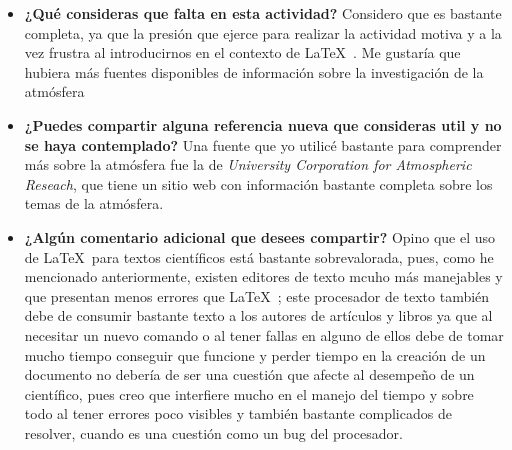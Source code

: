 \documentclass[12pt]{article}
\begin{document}
\begin{itemize}
\item\textbf{ ¿Qué consideras que falta en esta actividad? }
Considero que es bastante completa, ya que la presión que ejerce para realizar la actividad motiva y a la vez frustra al introducirnos en el contexto de \LaTeX\ . Me gustaría que hubiera más fuentes disponibles de información sobre la investigación de la atmósfera

\item \textbf{¿Puedes compartir alguna referencia nueva que consideras util y no se haya contemplado?}
Una fuente que yo utilicé bastante para comprender más sobre la atmósfera fue la de \textit{University Corporation for Atmospheric Reseach}, que tiene un sitio web con información bastante completa sobre los temas de la atmósfera.

\item \textbf{¿Algún comentario adicional que desees compartir?}
Opino que el uso de \LaTeX\ para textos científicos está bastante sobrevalorada, pues, como he mencionado anteriormente, existen editores de texto mcuho más manejables y que presentan menos errores que \LaTeX\ ; este procesador de texto también debe de consumir bastante texto a los autores de artículos y libros ya que al necesitar un nuevo comando o al tener fallas en alguno de ellos debe de tomar mucho tiempo conseguir que funcione y perder tiempo en la creación de un documento no debería de ser una cuestión que afecte al desempeño de un científico, pues creo que interfiere mucho en el manejo del tiempo y sobre todo al tener errores poco visibles y también bastante complicados de resolver, cuando es una cuestión como un bug del procesador.

\end{itemize}

\newpage
\end{document}
